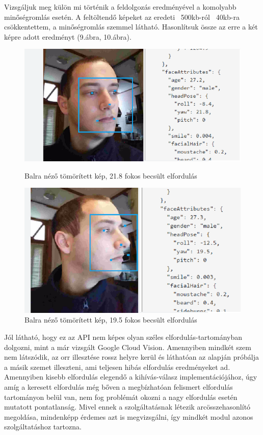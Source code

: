 Vizsgáljuk meg külön mi történik a feldolgozás eredményével a komolyabb minőségromlás esetén. A feltöltendő képeket az eredeti ~500kb-ról ~40kb-ra csökkentettem, a minőségromlás szemmel látható. Hasonlítsuk össze az erre a két képre adott eredményt (9.ábra, 10.ábra).
\begin{figure}[h]
 \begin{minipage}{.5\textwidth} 
\centering
    \includegraphics[scale=0.3]{img/mpo_left_compressed}
    \caption{Balra néző tömörített kép, 21.8 fokos becsült elfordulás}
 \end{minipage}
 \begin{minipage}{.5\textwidth} 
\centering
     \includegraphics[scale=0.3]{img/mpo_very_left_compressed}
     \caption{Balra néző tömörített kép, 19.5 fokos becsült elfordulás}
 \end{minipage}
\end{figure}

Jól látható, hogy ez az API nem képes olyan széles elfordulás-tartományban dolgozni, mint a már vizsgált Google Cloud Vision. Amennyiben mindkét szem nem látszódik, az orr illesztése rossz helyre kerül és láthatóan az alapján próbálja a másik szemet illeszteni, ami teljesen hibás elfordulás eredményeket ad. Amennyiben kisebb elfordulás elegendő a kihívás-válasz implementációjához, úgy amíg a keresett elfordulás még bőven a megbízhatóan felismert elfordulás tartományon belül van, nem fog problémát okozni a nagy elfordulás esetén mutatott pontatlanság. Mivel ennek a szolgáltatásnak létezik arcösszehasonlító megoldása, mindenképp érdemes azt is megvizsgálni, így mindkét modul azonos szolgáltatáshoz tartozna.

